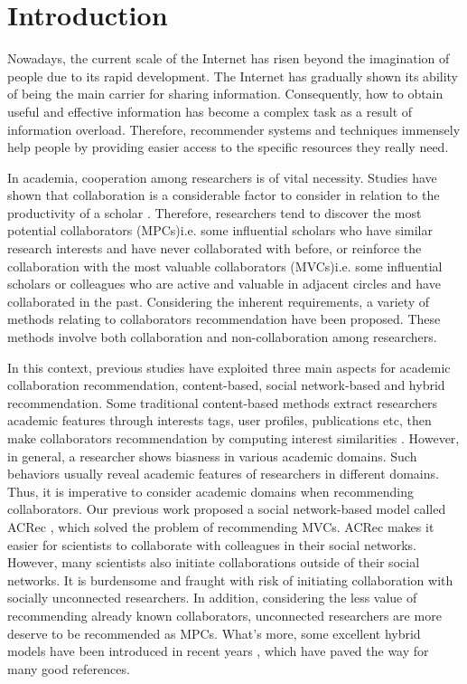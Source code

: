 \documentclass[review]{elsarticle}
\begin{document}
\linenumbers


\section{Introduction}
Nowadays, the current scale of the Internet has risen beyond the imagination of people due to its rapid development. The Internet has gradually shown its ability of being the main carrier for sharing information. Consequently, how to obtain useful and effective information has become a complex task as a result of information overload. Therefore, recommender systems and techniques immensely help people by providing easier access to the specific resources they really need.

In academia, cooperation among researchers is of vital necessity. Studies have shown that collaboration is a considerable factor to consider in relation to the productivity of a scholar \cite{lee2005impact}. Therefore, researchers tend to discover the most potential collaborators (MPCs)i.e. some influential scholars who have similar research interests and have never collaborated with before, or reinforce the collaboration with the most valuable collaborators (MVCs)i.e. some influential scholars or colleagues who are active and valuable in adjacent circles and have collaborated in the past. Considering the inherent requirements, a variety of methods relating to collaborators recommendation have been proposed. These methods involve both collaboration and non-collaboration among researchers.

In this context, previous studies have exploited three main aspects for academic collaboration recommendation, content-based, social network-based and hybrid recommendation. Some traditional content-based methods extract researchers academic features through interests tags, user profiles, publications etc, then make collaborators recommendation by computing interest similarities \cite{lopes2010collaboration,gollapalli2012similar,kim2010collaborative}. However, in general, a researcher shows biasness in various academic domains. Such behaviors usually reveal academic features of researchers in different domains. Thus, it is imperative to consider academic domains when recommending collaborators. Our previous work proposed a social network-based model called ACRec \cite{li2014acrec}, which solved the problem of recommending MVCs. ACRec makes it easier for scientists to collaborate with colleagues in their social networks. However, many scientists also initiate collaborations outside of their social networks. It is burdensome and fraught with risk of initiating collaboration with socially unconnected researchers. In addition, considering the less value of recommending already known collaborators, unconnected researchers are more deserve to be recommended as MPCs. What's more, some excellent hybrid models have been introduced in recent years \cite{lee2011recommending,chen2011collabseer,cohen2013recommending}, which have paved the way for many good references.
\end{document}
